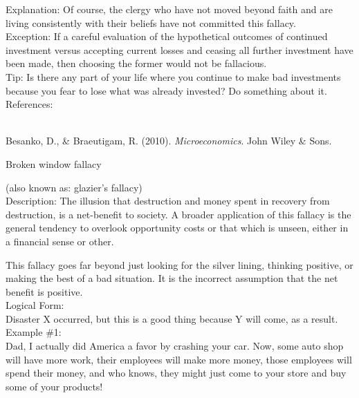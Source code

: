 \documentclass[a4paper,12pt,single,pdftex]{scrartcl}
\begin{document}
    
      Explanation: Of course, the clergy who have not moved beyond faith and are living consistently with their beliefs have not committed this fallacy.
    \\

    
      Exception: If a careful evaluation of the hypothetical outcomes of continued investment versus accepting current losses and ceasing all further investment have been made, then choosing the former would not be fallacious.
    \\

    
      Tip: Is there any part of your life where you continue to make bad investments because you fear to lose what was already invested? Do something about it.
    \\

    References:

    
      
        
      \\

      
        
          Besanko, D., \& Braeutigam, R. (2010). {\it Microeconomics}. John Wiley \& Sons.
        
      
    
  

Broken window fallacy
    
      (also known as: glazier's fallacy)
    \\

  
    Description: The illusion that destruction and money spent in recovery from destruction, is a net-benefit to society.  A broader application of this fallacy is the general tendency to overlook opportunity costs or that which is unseen, either in a financial sense or other.

    
      This fallacy goes far beyond just looking for the silver lining, thinking positive, or making the best of a bad situation.  It is the incorrect assumption that the net benefit is positive.
    \\

    
      Logical Form:
    \\

    
      Disaster X occurred, but this is a good thing because Y will come, as a result.
    \\

    
      Example \#1:
    \\

    
      Dad, I actually did America a favor by crashing your car.  Now, some auto shop will have more work, their employees will make more money, those employees will spend their money, and who knows, they might just come to your store and buy some of your products!
    \\
\end{document}
